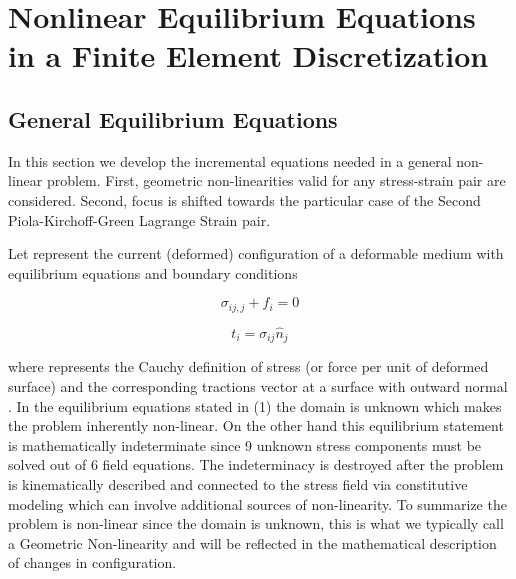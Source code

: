 \chapter[Nonlinear Equilibrium in FEM]{Nonlinear Equilibrium Equations in a Finite Element Discretization}

\section{General Equilibrium Equations}
In this section we develop the incremental equations needed in a general non-linear problem.  First, geometric non-linearities valid for any stress-strain pair are considered.  Second, focus is shifted towards the particular case of the Second Piola-Kirchoff-Green Lagrange Strain pair.

Let   represent the current (deformed) configuration of a deformable medium with equilibrium equations and boundary conditions

\begin{equation}
{\sigma _{ij,j}} + {f_i} = 0	 
\end{equation}			

\begin{equation}
{t_i} = {\sigma _{ij}}{\hat n_j}
\end{equation}	 		

where   represents the Cauchy definition of stress (or force per unit of deformed surface) and   the corresponding tractions vector at a surface with outward normal  .  In the equilibrium equations stated in (1) the domain   is unknown which makes the problem inherently non-linear.  On the other hand this equilibrium statement is mathematically indeterminate since 9 unknown stress components must be solved out of 6 field equations.  The indeterminacy is destroyed after the problem is kinematically described and connected to the stress field via constitutive modeling which can involve additional sources of non-linearity.  To summarize the problem is non-linear since the domain   is unknown, this is what we typically call a Geometric Non-linearity and will be reflected in the mathematical description of changes in configuration.




